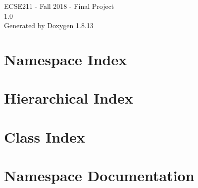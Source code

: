 \documentclass[twoside]{book}
\newcommand{\+}{\discretionary{\mbox{\scriptsize$\hookleftarrow$}}{}{}}
\newcommand{\clearemptydoublepage}{%
  \newpage{\pagestyle{empty}\cleardoublepage}%
}
\begin{document}
\hypersetup{pageanchor=false,
             bookmarksnumbered=true,
             pdfencoding=unicode
            }
\begin{titlepage}
\vspace*{7cm}
\begin{center}%
{\Large E\+C\+S\+E211 -\/ Fall 2018 -\/ Final Project \\[1ex]\large 1.\+0 }\\
\vspace*{1cm}
{\large Generated by Doxygen 1.8.13}\\
\end{center}
\end{titlepage}
\clearemptydoublepage
{}
\tableofcontents
\clearemptydoublepage
{}
\hypersetup{pageanchor=true}

\chapter{Namespace Index}

\chapter{Hierarchical Index}

\chapter{Class Index}

\chapter{Namespace Documentation}

\end{document}

